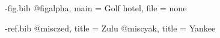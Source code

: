 \begin{filecontents*}{\jobname-fig.bib}
@fig{alpha, main = {Golf hotel}, file = {none}}
\end{filecontents*}
\begin{filecontents*}{\jobname-ref.bib}
@misc{zed, title = {Zulu}}
@misc{yak, title = {Yankee}}
\end{filecontents*}
\documentclass{article}
\usepackage[nopics]{figbib}

Text \cite{zed}.




